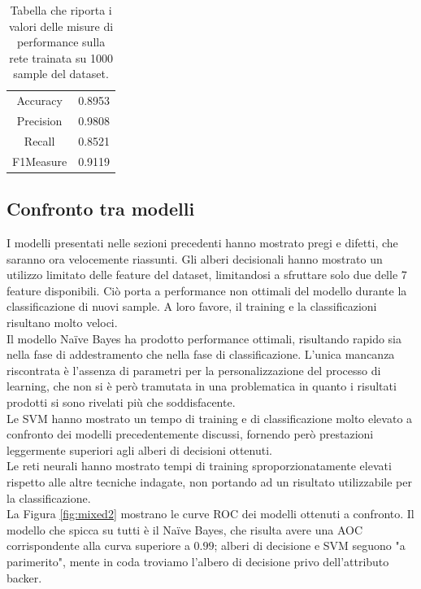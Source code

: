 \begin{table}
	\caption{Tabella che riporta i valori delle misure di performance sulla rete trainata su 1000 sample del dataset.}
	\label{tab:nnperformance}
	\centering
	\begin{tabular}{c|c}
		Accuracy & 0.8953  \\ 
		Precision & 0.9808  \\
		Recall & 0.8521  \\
		F1Measure & 0.9119  \\
	\end{tabular}
\end{table}

\subsection{Confronto tra modelli}
I modelli presentati nelle sezioni precedenti hanno mostrato pregi e difetti, che saranno ora velocemente riassunti.
Gli alberi decisionali hanno mostrato un utilizzo limitato delle feature del dataset, limitandosi a sfruttare solo due delle 7 feature disponibili. Ciò porta a performance non ottimali del modello durante la classificazione di nuovi sample. A loro favore, il training e la classificazioni risultano molto veloci.\\
Il modello Na\"ive Bayes ha prodotto performance ottimali, risultando rapido sia nella fase di addestramento che nella fase di classificazione. L'unica mancanza riscontrata è l'assenza di parametri per la personalizzazione del processo di learning, che non si è però tramutata in una problematica in quanto i risultati prodotti si sono rivelati più che soddisfacente.\\
Le SVM hanno mostrato un tempo di training e di classificazione molto elevato a confronto dei modelli precedentemente discussi, fornendo però prestazioni leggermente superiori agli alberi di decisioni ottenuti.\\
Le reti neurali hanno mostrato tempi di training sproporzionatamente elevati rispetto alle altre tecniche indagate, non portando ad un risultato utilizzabile per la classificazione.\\
La Figura \ref{fig:mixed2} mostrano le curve ROC dei modelli ottenuti a confronto. Il modello che spicca su tutti è il Na\"ive Bayes, che risulta  avere una AOC corrispondente alla curva superiore a $0.99$; alberi di decisione e SVM seguono "a parimerito", mente in coda troviamo l'albero di decisione privo dell'attributo backer.

